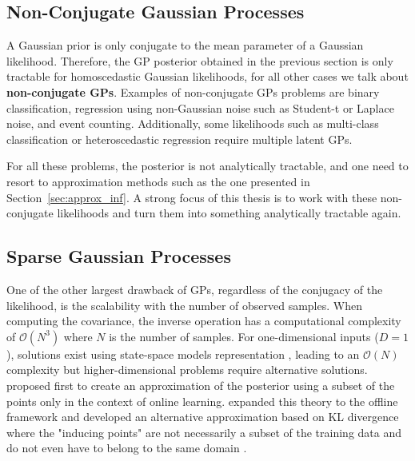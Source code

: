\subsection{Non-Conjugate Gaussian Processes}

A Gaussian prior is only conjugate to the mean parameter of a Gaussian likelihood.
Therefore, the \ac{GP} posterior obtained in the previous section is only tractable for homoscedastic Gaussian likelihoods, for all other cases we talk about \textbf{non-conjugate \ac{GPs}}.
Examples of non-conjugate \ac{GPs} problems are binary classification, regression using non-Gaussian noise such as Student-t or Laplace noise, and event counting.
Additionally, some likelihoods such as multi-class classification or heteroscedastic regression require multiple latent \ac{GPs}.

For all these problems, the posterior is not analytically tractable, and one need to resort to approximation methods such as the one presented in Section~\ref{sec:approx_inf}.
A strong focus of this thesis is to work with these non-conjugate likelihoods and turn them into something analytically tractable again.

\subsection{Sparse Gaussian Processes}
One of the other largest drawback of \ac{GPs}, regardless of the conjugacy of the likelihood, is the scalability with the number of observed samples.
When computing the covariance, the inverse operation has a computational complexity of $\mathcal{O}(N^3)$ where $N$ is the number of samples.
For one-dimensional inputs ($D=1$), solutions exist using state-space models representation \cite{pmlr-v9-turner10a,solinInfiniteHorizonGaussianProcesses2018}, leading to an $\mathcal{O}(N)$ complexity but higher-dimensional problems require alternative solutions.
\citet{csato2002sparse} proposed first to create an approximation of the posterior using a subset of the points only in the context of online learning.
\citet{snelsonSparseGaussianProcesses2009} expanded this theory to the offline framework and \citet{Titsias2009} developed an alternative approximation based on KL divergence where the "inducing points" are not necessarily a subset of the training data and do not even have to belong to the same domain \cite{NIPS2009_5ea1649a, vdw2020framework}.

